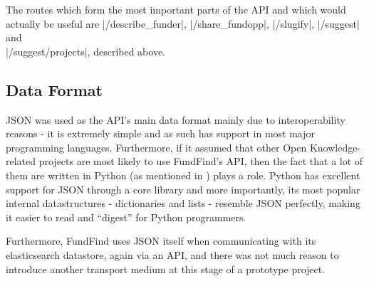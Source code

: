The routes which form the most important parts of the API and which would actually be useful are |/describe_funder|, |/share_fundopp|, |/slugify|, |/suggest| and
\\|/suggest/projects|, described above.

\subsection{Data Format}
  JSON was used as the API's main data format mainly due to interoperability reasons - it is extremely simple and as such has support in most major programming languages. Furthermore, if it assumed that other Open Knowledge-related projects are most likely to use FundFind's API, then the fact that a lot of them are written in Python (as mentioned in ) plays a role. Python has excellent support for JSON through a core library and more importantly, its most popular internal datastructures - dictionaries and lists - resemble JSON perfectly, making it easier to read and ``digest'' for Python programmers.
  
  Furthermore, FundFind uses JSON itself when communicating with its elasticsearch datastore, again via an API, and there was not much reason to introduce another transport medium at this stage of a prototype project.
 
